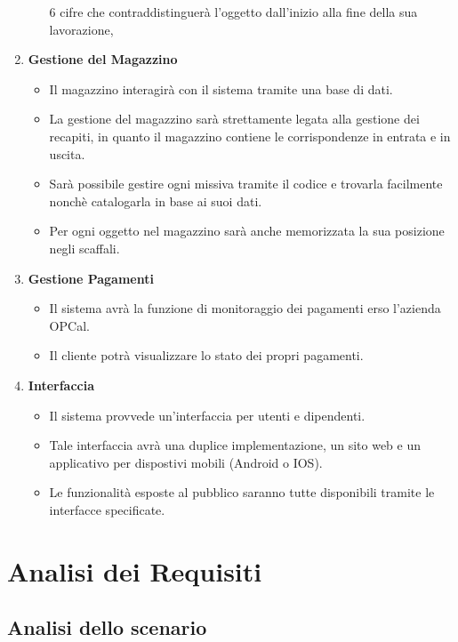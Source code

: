 \documentclass[a4paper,12pt]{article}
\begin{document}
\begin{enumerate}
\begin{itemize}
            6 cifre che contraddistinguerà l'oggetto dall'inizio alla fine della sua lavorazione,
	      \end{itemize}
	\item \textbf{Gestione del Magazzino} \begin{itemize}
		      \item Il magazzino interagirà con il sistema tramite una base di dati.
		      \item La gestione del magazzino sarà strettamente legata alla gestione dei recapiti, in quanto il magazzino contiene 
            le corrispondenze in entrata e in uscita.
		      \item Sarà possibile gestire ogni missiva tramite il codice e trovarla facilmente nonchè catalogarla in base ai suoi dati.
		      \item Per ogni oggetto nel magazzino sarà anche memorizzata la sua posizione negli scaffali.
	      \end{itemize}
	\item \textbf{Gestione Pagamenti} \begin{itemize}
		      \item Il sistema avrà la funzione di monitoraggio dei pagamenti erso l'azienda OPCal.
		      \item Il cliente potrà visualizzare lo stato dei propri pagamenti.
	      \end{itemize}
	\item \textbf{Interfaccia} \begin{itemize}
		      \item Il sistema provvede un'interfaccia per utenti e dipendenti.
		      \item Tale interfaccia avrà una duplice implementazione, un sito web e un applicativo per dispostivi mobili (Android o IOS).
		      \item Le funzionalità esposte al pubblico saranno tutte disponibili tramite le interfacce specificate.
	      \end{itemize}
\end{enumerate}

\newpage
\section{Analisi dei Requisiti}
\subsection{Analisi dello scenario}
\end{document}
